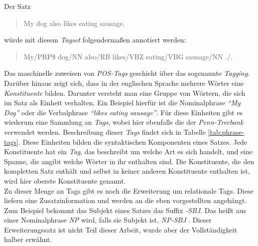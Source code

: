 Der Satz
\begin{quote}
My dog also likes eating sausage.
\end{quote}
würde mit diesem \textit{Tagset} folgendermaßen annotiert werden:
\begin{quote}
My/PRP\$ dog/NN also/RB likes/VBZ eating/VBG sausage/NN ./.
\end{quote}
Das maschinelle zuweisen von \textit{POS-Tags} geschieht über das sogenannte \textit{Tagging}. \\
Darüber hinaus zeigt sich, dass in der englischen Sprache mehrere Wörter eine \textit{Konstituente} bilden. Darunter versteht man eine Gruppe von Wörtern, die sich im Satz als Einheit verhalten. Ein Beispiel hierfür ist die Nominalphrase \textit{``My Dog''} oder die Verbalphrase \textit{``likes eating sausage''}. Für diese Einheiten gibt es wiederum eine Sammlung an \textit{Tags}, wobei hier ebenfalls die der \textit{Penn-Treebank} verwendet werden. Beschreibung dieser \textit{Tags} findet sich in Tabelle \ref{tab:phrase-tags}. Diese Einheiten bilden die syntaktischen Komponenten eines Satzes. Jede Konstituente hat ein \textit{Tag}, das beschreibt um welche Art es sich handelt, und eine Spanne, die angibt welche Wörter in ihr enthalten sind. Die Konstituente, die den kompletten Satz enthält und selbst in keiner anderen Konstituente enthalten ist, wird hier oberste Konstituente genannt. %
\\Zu dieser Menge an Tags gibt es noch die Erweiterung um relationale Tags. Diese liefern eine Zusatzinformation und werden an die eben vorgestellten angehängt. Zum Beispiel bekommt das Subjekt eines Satzes das Suffix \textit{-SBJ}. Das heißt aus einer Nominalphrase \textit{NP} wird, falls sie Subjekt ist, \textit{NP-SBJ} \cite{relationaltags}. Dieser Erweiterungssatz ist nicht Teil dieser Arbeit, wurde aber der Vollständigkeit halber erwähnt.
